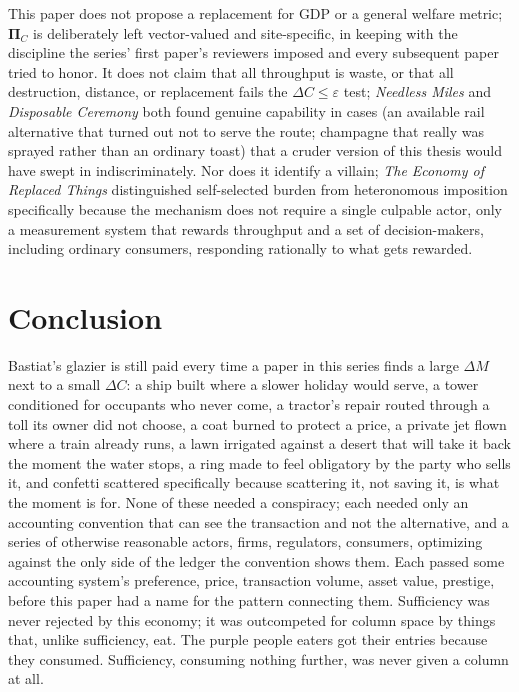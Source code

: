 \documentclass[11pt]{article}
\begin{document}
This paper does not propose a replacement for GDP or a general welfare metric; $\boldsymbol{\Pi}_C$ is deliberately left vector-valued and site-specific, in keeping with the discipline the series' first paper's reviewers imposed and every subsequent paper tried to honor. It does not claim that all throughput is waste, or that all destruction, distance, or replacement fails the $\Delta C \leq \varepsilon$ test; \emph{Needless Miles} and \emph{Disposable Ceremony} both found genuine capability in cases (an available rail alternative that turned out not to serve the route; champagne that really was sprayed rather than an ordinary toast) that a cruder version of this thesis would have swept in indiscriminately. Nor does it identify a villain; \emph{The Economy of Replaced Things} distinguished self-selected burden from heteronomous imposition specifically because the mechanism does not require a single culpable actor, only a measurement system that rewards throughput and a set of decision-makers, including ordinary consumers, responding rationally to what gets rewarded.

\section{Conclusion}

Bastiat's glazier is still paid every time a paper in this series finds a large $\Delta M$ next to a small $\Delta C$: a ship built where a slower holiday would serve, a tower conditioned for occupants who never come, a tractor's repair routed through a toll its owner did not choose, a coat burned to protect a price, a private jet flown where a train already runs, a lawn irrigated against a desert that will take it back the moment the water stops, a ring made to feel obligatory by the party who sells it, and confetti scattered specifically because scattering it, not saving it, is what the moment is for. None of these needed a conspiracy; each needed only an accounting convention that can see the transaction and not the alternative, and a series of otherwise reasonable actors, firms, regulators, consumers, optimizing against the only side of the ledger the convention shows them. Each passed some accounting system's preference, price, transaction volume, asset value, prestige, before this paper had a name for the pattern connecting them. Sufficiency was never rejected by this economy; it was outcompeted for column space by things that, unlike sufficiency, eat. The purple people eaters got their entries because they consumed. Sufficiency, consuming nothing further, was never given a column at all.
\end{document}
